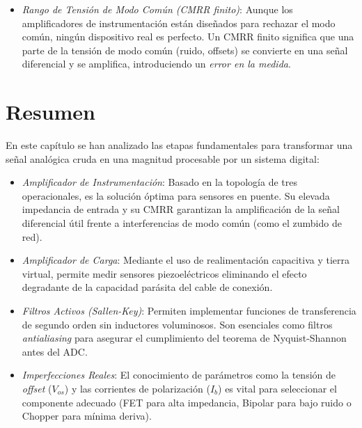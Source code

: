 \begin{itemize}
    \item \emph{Rango de Tensión de Modo Común (CMRR finito)}: Aunque los amplificadores de instrumentación están diseñados para rechazar el modo común, ningún dispositivo real es perfecto. Un CMRR finito significa que una parte de la tensión de modo común (ruido, offsets) se convierte en una señal diferencial y se amplifica, introduciendo un \emph{error en la medida}.
\end{itemize}


\section{Resumen}\label{sec:resumen_opamp}

En este capítulo se han analizado las etapas fundamentales para transformar una señal analógica cruda en una magnitud procesable por un sistema digital:

\begin{itemize}
    \item \emph{Amplificador de Instrumentación}: Basado en la topología de tres operacionales, es la solución óptima para sensores en puente. Su elevada impedancia de entrada y su CMRR garantizan la amplificación de la señal diferencial útil frente a interferencias de modo común (como el zumbido de red).
    \item \emph{Amplificador de Carga}: Mediante el uso de realimentación capacitiva y tierra virtual, permite medir sensores piezoeléctricos eliminando el efecto degradante de la capacidad parásita del cable de conexión.
    \item \emph{Filtros Activos (Sallen-Key)}: Permiten implementar funciones de transferencia de segundo orden sin inductores voluminosos. Son esenciales como filtros \textit{antialiasing} para asegurar el cumplimiento del teorema de Nyquist-Shannon antes del ADC.
    \item \emph{Imperfecciones Reales}: El conocimiento de parámetros como la tensión de \textit{offset} ($V_{os}$) y las corrientes de polarización ($I_b$) es vital para seleccionar el componente adecuado (FET para alta impedancia, Bipolar para bajo ruido o Chopper para mínima deriva).
\end{itemize}


\cleardoublepage
